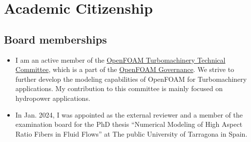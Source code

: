 \section{Academic Citizenship}{}

\subsection{Board memberships}

\begin{itemize}[]
    \item I am an active member of the \href{https://wiki.openfoam.com/Turbomachinery_Special_Interest_Group}{OpenFOAM Turbomachinery Technical Committee}, which is a part of the \href{https://www.openfoam.com/governance/overview}{OpenFOAM Governance}. We strive to further develop the modeling capabilities of OpenFOAM for Turbomachinery applications. My contribution to this committee is mainly focused on hydropower applications.

    \item In Jan. 2024, I was appointed as the external reviewer and a member of the examination board for the PhD thesis ``Numerical Modeling of High Aspect Ratio Fibers in Fluid Flows'' at The public University of Tarragona in Spain.
\end{itemize}



